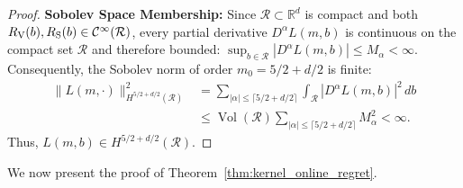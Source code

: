 \begin{proof}
\noindent\textbf{Sobolev Space Membership:}
Since $\mathcal{R} \subset \mathbb{R}^d$ is compact and both $R_{\mathrm{V}}(b), R_{\mathrm{S}}(b) \in \mathcal{C}^\infty(\mathcal{R})$, every partial derivative $D^\alpha L(m,b)$ is continuous on the compact set $\mathcal{R}$ and therefore bounded: $\sup_{b \in \mathcal{R}} |D^\alpha L(m,b)| \le M_\alpha < \infty$.
Consequently, the Sobolev norm of order $m_0 = 5/2 + d/2$ is finite:
\begin{align*}
    \|L(m, \cdot)\|_{H^{5/2+d/2}(\mathcal{R})}^2 &= \sum_{|\alpha| \le \lceil 5/2 + d/2 \rceil} \int_{\mathcal{R}} |D^\alpha L(m, b)|^2 \, db \\
    &\le \operatorname{Vol}(\mathcal{R}) \sum_{|\alpha| \le \lceil 5/2 + d/2 \rceil} M_\alpha^2 < \infty.
\end{align*}
Thus, $L(m, b) \in H^{5/2+d/2}(\mathcal{R})$.
\end{proof}

We now present the proof of Theorem~\ref{thm:kernel_online_regret}.

